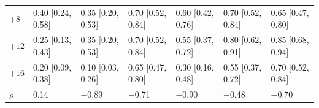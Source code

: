 \begin{tabular}{w{r}{0.6cm} w{r}{1.75cm}w{r}{1.75cm}w{r}{1.75cm}w{r}{1.75cm}w{r}{1.75cm}w{r}{1.75cm}}
$+8$ & 0.40 {\scriptsize[0.24, 0.58]} & 0.35 {\scriptsize[0.20, 0.53]} & 0.70 {\scriptsize[0.52, 0.84]} & 0.60 {\scriptsize[0.42, 0.76]} & 0.70 {\scriptsize[0.52, 0.84]} & 0.65 {\scriptsize[0.47, 0.80]} \\
$+12$ & 0.25 {\scriptsize[0.13, 0.43]} & 0.35 {\scriptsize[0.20, 0.53]} & 0.70 {\scriptsize[0.52, 0.84]} & 0.55 {\scriptsize[0.37, 0.72]} & 0.80 {\scriptsize[0.62, 0.91]} & 0.85 {\scriptsize[0.68, 0.94]} \\
$+16$ & 0.20 {\scriptsize[0.09, 0.38]} & 0.10 {\scriptsize[0.03, 0.26]} & 0.65 {\scriptsize[0.47, 0.80]} & 0.30 {\scriptsize[0.16, 0.48]} & 0.55 {\scriptsize[0.37, 0.72]} & 0.70 {\scriptsize[0.52, 0.84]} \\
\midrule
$\rho$ & 0.14 & $-$0.89 & $-$0.71 & $-$0.90 & $-$0.48 & $-$0.70 \\
\bottomrule
\end{tabular}
